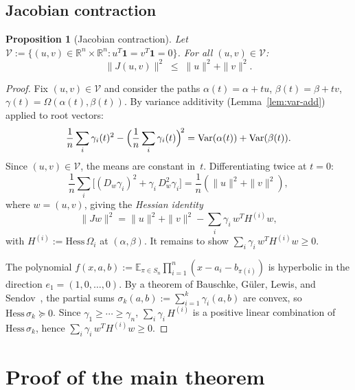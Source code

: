 \documentclass[11pt,a4paper]{amsart}
\theoremstyle{plain}
\newtheorem{proposition}[theorem]{Proposition}
\theoremstyle{definition}
\theoremstyle{remark}
\newcommand{\R}{\mathbb{R}}
\begin{document}
\subsection{Jacobian contraction}

\begin{proposition}[Jacobian contraction]
\label{prop:jac-contract}
Let $\mathcal{V}:=\{(u,v)\in\R^n\times\R^n:
u^T\mathbf{1}=v^T\mathbf{1}=0\}$.
For all $(u,v)\in\mathcal{V}$:
\begin{equation}\label{eq:contraction}
  \bigl\|J(u,v)\bigr\|^2
  \;\le\;\|u\|^2+\|v\|^2.
\end{equation}
\end{proposition}

\begin{proof}
Fix $(u,v)\in\mathcal{V}$ and consider the paths
$\alpha(t)=\alpha+tu$, $\beta(t)=\beta+tv$,
$\gamma(t)=\Omega(\alpha(t),\beta(t))$.
By variance additivity (Lemma~\ref{lem:var-add}) applied to
root vectors:
\[
  \frac{1}{n}\sum_i\gamma_i(t)^2
  -\Bigl(\frac{1}{n}\sum_i\gamma_i(t)\Bigr)^{\!2}
  =\mathrm{Var}(\alpha(t))+\mathrm{Var}(\beta(t)).
\]
Since $(u,v)\in\mathcal{V}$, the means are constant in~$t$.
Differentiating twice at $t=0$:
\[
  \frac{1}{n}\sum_i\bigl[
    (D_w\gamma_i)^2+\gamma_i\,D_w^2\gamma_i
  \bigr]
  =\frac{1}{n}(\|u\|^2+\|v\|^2),
\]
where $w=(u,v)$, giving the \emph{Hessian identity}
\begin{equation}\label{eq:hessian-id}
  \|Jw\|^2
  =\|u\|^2+\|v\|^2
  -\sum_{i}\gamma_i\,w^T H^{(i)} w,
\end{equation}
with $H^{(i)}:=\mathrm{Hess}\,\Omega_i$ at
$(\alpha,\beta)$.
It remains to show
$\sum_i\gamma_i\,w^T H^{(i)} w\ge 0$.

The polynomial
$f(x,a,b):=\mathbb{E}_{\pi\in S_n}
\prod_{i=1}^n(x-a_i-b_{\pi(i)})$
is hyperbolic in the direction $e_1=(1,0,\ldots,0)$.
By a theorem of Bauschke, G\"uler, Lewis, and
Sendov~\cite{BGLS}, the partial sums
$\sigma_k(a,b):=\sum_{i=1}^k\gamma_i(a,b)$ are convex,
so $\mathrm{Hess}\,\sigma_k\succeq 0$.
Since $\gamma_1\ge\cdots\ge\gamma_n$,
$\sum_i\gamma_i\,H^{(i)}$ is a positive linear combination
of $\mathrm{Hess}\,\sigma_k$, hence
$\sum_i\gamma_i\,w^T H^{(i)} w\ge 0$.
\end{proof}


\section{Proof of the main theorem}
\label{sec:proof}
\end{document}
